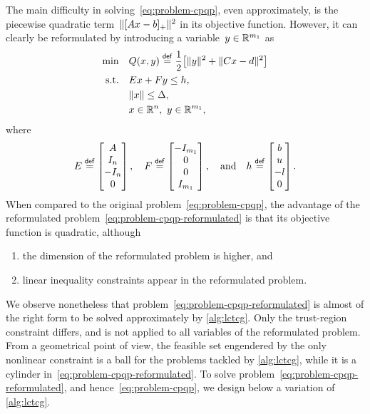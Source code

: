 The main difficulty in solving~\cref{eq:problem-cpqp}, even approximately, is the piecewise quadratic term~$\norm{\posp{A \iter - b}}^2$ in its objective function.
However, it can clearly be reformulated by introducing a variable~$y \in \mathbb{R}^{m_1}$ as
\begin{subequations}
    \label{eq:problem-cpqp-reformulated}
    \begin{align}
        \min        & \quad Q(\iter, y) \eqdef \frac{1}{2} \big[ \norm{y}^2 + \norm{C \iter - d}^2 \big]\\
        \text{s.t.} & \quad E \iter + F y \le h,\\
                    & \quad \norm{\iter} \le \rad,\\
                    & \quad \iter \in \R^n, ~ y \in \R^{m_1}, \nonumber
    \end{align}
\end{subequations}
where
\begin{equation*}
    E \mathrel{\stackrel{\mathsf{def}}{=}}
    \begin{bmatrix}
        A\\
        I_n\\
        -I_n\\
        0
    \end{bmatrix}, \quad
    F \mathrel{\stackrel{\mathsf{def}}{=}}
    \begin{bmatrix}
        -I_{m_1}\\
        0\\
        0\\
        I_{m_1}
    \end{bmatrix}, \quad \text{and} \quad
    h \mathrel{\stackrel{\mathsf{def}}{=}}
    \begin{bmatrix}
        b\\
        u\\
        -l\\
        0
    \end{bmatrix}.
\end{equation*}
When compared to the original problem~\cref{eq:problem-cpqp}, the advantage of the reformulated problem~\cref{eq:problem-cpqp-reformulated} is that its objective function is quadratic, although
\begin{enumerate}
    \item the dimension of the reformulated problem is higher, and
    \item linear inequality constraints appear in the reformulated problem.
\end{enumerate}

We observe nonetheless that problem~\cref{eq:problem-cpqp-reformulated} is almost of the right form to be solved approximately by \cref{alg:lctcg}.
Only the trust-region constraint differs, and is not applied to all variables of the reformulated problem.
From a geometrical point of view, the feasible set engendered by the only nonlinear constraint is a ball for the problems tackled by \cref{alg:lctcg}, while it is a cylinder in~\cref{eq:problem-cpqp-reformulated}.
To solve problem~\cref{eq:problem-cpqp-reformulated}, and hence~\cref{eq:problem-cpqp}, we design below a variation of \cref{alg:lctcg}.

